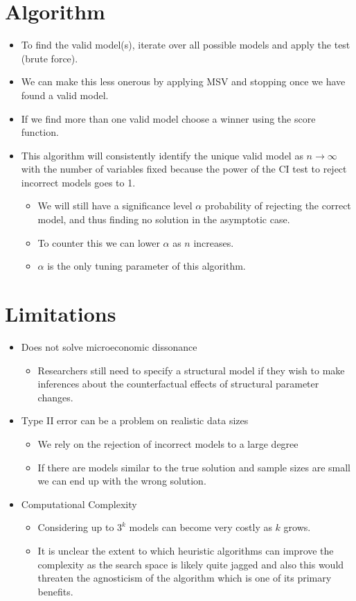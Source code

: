 \documentclass{article}
\begin{document}
\section*{Algorithm}
\begin{itemize}
    \item To find the valid model(s), iterate over all possible models and apply the test (brute force).
    \item We can make this less onerous by applying MSV and stopping once we have found a valid model.
    \item If we find more than one valid model choose a winner using the score function.
    \item This algorithm will consistently identify the unique valid model as $n \rightarrow \infty$ with the number of variables fixed because the power of the CI test to reject incorrect models goes to 1.
    \begin{itemize}
        \item We will still have a significance level $\alpha$ probability of rejecting the correct model, and thus finding no solution in the asymptotic case.
        \item To counter this we can lower $\alpha$ as $n$ increases. 
        \item $\alpha$ is the only tuning parameter of this algorithm.
    \end{itemize}
\end{itemize}

\section*{Limitations}
\begin{itemize}
    \item Does not solve microeconomic dissonance
    \begin{itemize}
        \item Researchers still need to specify a structural model if they wish to make inferences about the counterfactual effects of structural parameter changes.
    \end{itemize}
    \item Type II error can be a problem on realistic data sizes
    \begin{itemize}
        \item We rely on the rejection of incorrect models to a large degree
        \item If there are models similar to the true solution and sample sizes are small we can end up with the wrong solution.
    \end{itemize}
    \item Computational Complexity
    \begin{itemize}
        \item Considering up to $3^k$ models can become very costly as $k$ grows.
        \item It is unclear the extent to which heuristic algorithms can improve the complexity as the search space is likely quite jagged and also this would threaten the agnosticism of the algorithm which is one of its primary benefits.
    \end{itemize}
\end{itemize}
\end{document}
